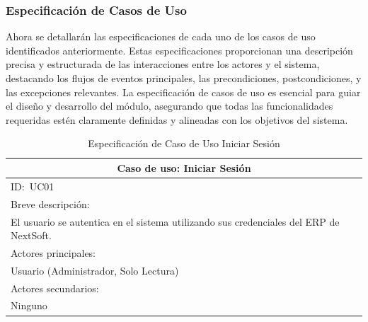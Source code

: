 \documentclass[stu, 12pt, letterpaper, donotrepeattitle, floatsintext, natbib]{apa7}
\begin{document}
\subsubsection{Especificaci\'on de Casos de Uso}
Ahora se detallar\'an las especificaciones de cada uno de los casos de uso identificados anteriormente. Estas especificaciones proporcionan una descripci\'on precisa y estructurada de las interacciones entre los actores y el sistema, destacando los flujos
de eventos principales, las precondiciones, postcondiciones, y las excepciones relevantes. La especificaci\'on de casos de uso es esencial para guiar el dise\~{n}o y desarrollo del m\'odulo, asegurando que todas las funcionalidades requeridas est\'en claramente
definidas y alineadas con los objetivos del sistema.
\newline
\begin{longtable}{@{} p{16.5cm} @{}}
    \caption{Especificaci\'on de Caso de Uso Iniciar Sesi\'on}\label{tab:UC01}                                                                \\ \toprule
    \multicolumn{1}{c}{Caso de uso: Iniciar Sesi\'on}                                                                                         \\ \midrule
    ID:~UC01                                                                                                                                  \\ \midrule
    Breve descripci\'on:                                                                                                                      \\
    El usuario se autentica en el sistema utilizando sus credenciales del ERP de NextSoft.                                                    \\ \midrule
    Actores principales:                                                                                                                      \\
    Usuario (Administrador, Solo Lectura)                                                                                                     \\ \midrule
    Actores secundarios:                                                                                                                      \\
    Ninguno                                                                                                                                   \\ \midrule

\end{longtable}
\end{document}
